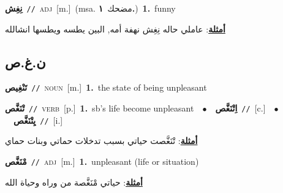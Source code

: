 \documentclass[10pt,a4paper,twoside]{article} %
\begin{document}
\begin{multicols}{2}
{\setlength\topsep{0pt}\textbf{\foreignlanguage{arabic}{نِغِش}}\ {\color{gray}\texttt{//}\color{black}}\ \textsc{adj}\ [m.]\ \color{gray}(msa. \foreignlanguage{arabic}{مضحك}~\foreignlanguage{arabic}{\textbf{١.}})\color{black}\ \textbf{1.}~funny\  \begin{flushright}\color{gray}\foreignlanguage{arabic}{\textbf{\underline{\foreignlanguage{arabic}{أمثلة}}}: عاملي حاله نِغِش نهفة أمه, البين يطسه ويطسها انشالله}\end{flushright}\color{black}} \vspace{2mm}

\vspace{-3mm}
\subsection*{\color{blue}\foreignlanguage{arabic}{ن.غ.ص}\color{blue}{}} 

{\setlength\topsep{0pt}\textbf{\foreignlanguage{arabic}{تَنْغِيص}}\ {\color{gray}\texttt{//}\color{black}}\ \textsc{noun}\ [m.]\ \textbf{1.}~the state of being unpleasant\ } \vspace{2mm}

{\setlength\topsep{0pt}\textbf{\foreignlanguage{arabic}{تْنَغَّص}}\ {\color{gray}\texttt{//}\color{black}}\ \textsc{verb}\ [p.]\ \textbf{1.}~sb's life become unpleasant\ \ $\bullet$\ \ \setlength\topsep{0pt}\textbf{\foreignlanguage{arabic}{اِتْنَغَّص}}\ {\color{gray}\texttt{//}\color{black}}\ [c.]\ \ $\bullet$\ \ \setlength\topsep{0pt}\textbf{\foreignlanguage{arabic}{يِتْنَغَّص}}\ {\color{gray}\texttt{//}\color{black}}\ [i.]\  \begin{flushright}\color{gray}\foreignlanguage{arabic}{\textbf{\underline{\foreignlanguage{arabic}{أمثلة}}}: تْنَغَّصت حياتي بسبب تدخلات حماتي وبنات حماي}\end{flushright}\color{black}} \vspace{2mm}

{\setlength\topsep{0pt}\textbf{\foreignlanguage{arabic}{مْنَغَّص}}\ {\color{gray}\texttt{//}\color{black}}\ \textsc{adj}\ [m.]\ \textbf{1.}~unpleasant (life or situation)\  \begin{flushright}\color{gray}\foreignlanguage{arabic}{\textbf{\underline{\foreignlanguage{arabic}{أمثلة}}}: حياتي مْنَغَّصة من وراه وحياة الله}\end{flushright}\color{black}} \vspace{2mm}


\end{multicols}
\end{document}
